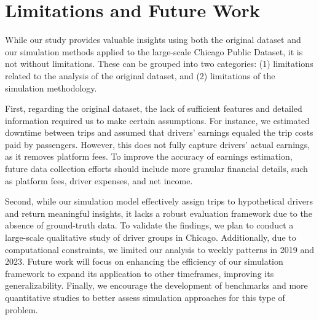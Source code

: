 \section{Limitations and Future Work}

While our study provides valuable insights using both the original dataset and our simulation methods applied to the large-scale Chicago Public Dataset, it is not without limitations. These can be grouped into two categories: (1) limitations related to the analysis of the original dataset, and (2) limitations of the simulation methodology.

First, regarding the original dataset, the lack of sufficient features and detailed information required us to make certain assumptions. For instance, we estimated downtime between trips and assumed that drivers' earnings equaled the trip costs paid by passengers. However, this does not fully capture drivers' actual earnings, as it removes platform fees. To improve the accuracy of earnings estimation, future data collection efforts should include more granular financial details, such as platform fees, driver expenses, and net income.

Second, while our simulation model effectively assign trips to hypothetical drivers and return meaningful insights, it lacks a robust evaluation framework due to the absence of ground-truth data. To validate the findings, we plan to conduct a large-scale qualitative study of driver groups in Chicago. Additionally, due to computational constraints, we limited our analysis to weekly patterns in 2019 and 2023. Future work will focus on enhancing the efficiency of our simulation framework to expand its application to other timeframes, improving its generalizability. Finally, we encourage the development of benchmarks and more quantitative studies to better assess simulation approaches for this type of problem.
    

